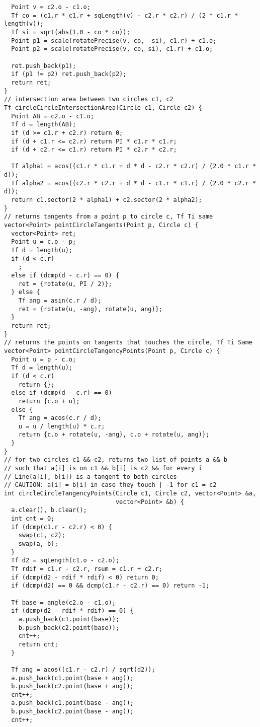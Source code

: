 \documentclass[FSZ,a4paper,onesided]{article}
\begin{document}
\begin{multicols*}{\COLS}
\begin{lstlisting}
  Point v = c2.o - c1.o;
  Tf co = (c1.r * c1.r + sqLength(v) - c2.r * c2.r) / (2 * c1.r * length(v));
  Tf si = sqrt(abs(1.0 - co * co));
  Point p1 = scale(rotatePrecise(v, co, -si), c1.r) + c1.o;
  Point p2 = scale(rotatePrecise(v, co, si), c1.r) + c1.o;

  ret.push_back(p1);
  if (p1 != p2) ret.push_back(p2);
  return ret;
}
// intersection area between two circles c1, c2
Tf circleCircleIntersectionArea(Circle c1, Circle c2) {
  Point AB = c2.o - c1.o;
  Tf d = length(AB);
  if (d >= c1.r + c2.r) return 0;
  if (d + c1.r <= c2.r) return PI * c1.r * c1.r;
  if (d + c2.r <= c1.r) return PI * c2.r * c2.r;

  Tf alpha1 = acos((c1.r * c1.r + d * d - c2.r * c2.r) / (2.0 * c1.r * d));
  Tf alpha2 = acos((c2.r * c2.r + d * d - c1.r * c1.r) / (2.0 * c2.r * d));
  return c1.sector(2 * alpha1) + c2.sector(2 * alpha2);
}
// returns tangents from a point p to circle c, Tf Ti same
vector<Point> pointCircleTangents(Point p, Circle c) {
  vector<Point> ret;
  Point u = c.o - p;
  Tf d = length(u);
  if (d < c.r)
    ;
  else if (dcmp(d - c.r) == 0) {
    ret = {rotate(u, PI / 2)};
  } else {
    Tf ang = asin(c.r / d);
    ret = {rotate(u, -ang), rotate(u, ang)};
  }
  return ret;
}
// returns the points on tangents that touches the circle, Tf Ti Same
vector<Point> pointCircleTangencyPoints(Point p, Circle c) {
  Point u = p - c.o;
  Tf d = length(u);
  if (d < c.r)
    return {};
  else if (dcmp(d - c.r) == 0)
    return {c.o + u};
  else {
    Tf ang = acos(c.r / d);
    u = u / length(u) * c.r;
    return {c.o + rotate(u, -ang), c.o + rotate(u, ang)};
  }
}
// for two circles c1 && c2, returns two list of points a && b
// such that a[i] is on c1 && b[i] is c2 && for every i
// Line(a[i], b[i]) is a tangent to both circles
// CAUTION: a[i] = b[i] in case they touch | -1 for c1 = c2
int circleCircleTangencyPoints(Circle c1, Circle c2, vector<Point> &a,
                               vector<Point> &b) {
  a.clear(), b.clear();
  int cnt = 0;
  if (dcmp(c1.r - c2.r) < 0) {
    swap(c1, c2);
    swap(a, b);
  }
  Tf d2 = sqLength(c1.o - c2.o);
  Tf rdif = c1.r - c2.r, rsum = c1.r + c2.r;
  if (dcmp(d2 - rdif * rdif) < 0) return 0;
  if (dcmp(d2) == 0 && dcmp(c1.r - c2.r) == 0) return -1;

  Tf base = angle(c2.o - c1.o);
  if (dcmp(d2 - rdif * rdif) == 0) {
    a.push_back(c1.point(base));
    b.push_back(c2.point(base));
    cnt++;
    return cnt;
  }

  Tf ang = acos((c1.r - c2.r) / sqrt(d2));
  a.push_back(c1.point(base + ang));
  b.push_back(c2.point(base + ang));
  cnt++;
  a.push_back(c1.point(base - ang));
  b.push_back(c2.point(base - ang));
  cnt++;


\end{lstlisting}
\end{multicols*}
\end{document}
